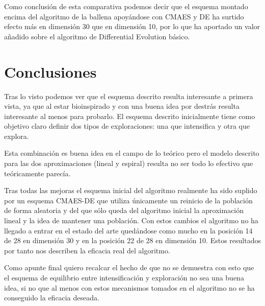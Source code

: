 \documentclass[12pt,a4paper]{article}
\begin{document}
	Como conclusión de esta comparativa podemos decir que el esquema montado encima del algoritmo de la ballena apoyándose con CMAES y DE ha surtido efecto más en dimensión 30 que en dimensión 10, por lo que ha aportado un valor añadido sobre el algoritmo de Differential Evolution básico.
	
	\newpage
	
	\section{Conclusiones}
	
	Tras lo visto podemos ver que el esquema descrito resulta interesante a primera vista, ya que al estar bioinspirado y con una buena idea por destrás resulta interesante al menos para probarlo. El esquema descrito inicialmente tiene como objetivo claro definir dos tipos de exploraciones: una que intensifica y otra que explora.
	
	Esta combinación es buena idea en el campo de lo teórico pero el modelo descrito para las dos aproximaciones (lineal y espiral) resulta no ser todo lo efectivo que teóricamente parecía.
	
	Tras todas las mejoras el esquema inicial del algoritmo realmente ha sido suplido por un esquema CMAES-DE que utiliza únicamente un reinicio de la población de forma aleatoria y del que sólo queda del algoritmo inicial la aproximación lineal y la idea de mantener una población. Con estos cambios el algoritmo no ha llegado a entrar en el estado del arte quedándose como mucho en la posición 14 de 28 en dimensión 30 y en la posición 22 de 28 en dimensión 10. Estos resultados por tanto nos describen la eficacia real del algoritmo.
	
	Como apunte final quiero recalcar el hecho de que no se demuestra con esto que el esquema de equilibrio entre intensificación y exploración no sea una buena idea, si no que al menos con estos mecanismos tomados en el algoritmo no se ha conseguido la eficacia deseada.
	
	
	
	
	
	\newpage
	\clearpage
	
\end{document}
